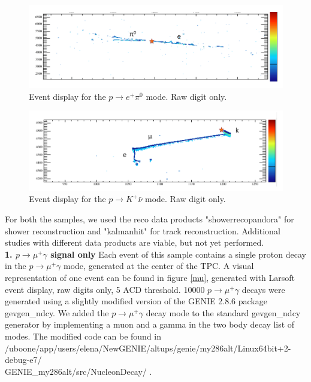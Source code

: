 \documentclass[a4paper, 10pt]{article}
\begin{document}
\begin{figure}[hpbt]
\centering
\includegraphics[width=6in]{evd/pi1}
\caption{Event display for the $p \rightarrow e^{+} \pi^{0}$ mode. Raw digit only.}
\label{pi}
\end{figure}

\begin{figure}[hpbt]
\centering
\includegraphics[width=6in]{evd/K1}
\caption{Event display for the $p \rightarrow K^{+} \bar\nu$ mode. Raw digit only.}
\label{K}
\end{figure}

For both the samples, we used the reco data products "showerrecopandora" for shower reconstruction and "kalmanhit" for track reconstruction. Additional studies with different data products are viable, but not  yet performed.\\
 
{\bf 1. $p \rightarrow \mu^{+} \gamma$   signal only} Each event of this sample contains a single proton decay in the $p \rightarrow \mu^{+} \gamma$  mode, generated at the center of the TPC. A visual representation of one event can be found in figure \ref{mu}, generated with Larsoft event display, raw digits only, 5 ACD threshold. 
10000 $p \rightarrow \mu^{+} \gamma$  decays were generated using a slightly modified version of the GENIE 2.8.6 package gevgen\_ndcy. We added the  $p \rightarrow \mu^{+} \gamma$ decay mode to the standard gevgen\_ndcy generator by implementing a muon and a gamma in the two body decay list  of modes. The modified code can be found in 
/uboone/app/users/elena/NewGENIE/altups/genie/my286alt/Linux64bit+2-debug-e7/\\GENIE\_my286alt/src/NucleonDecay/ .
\end{document}
